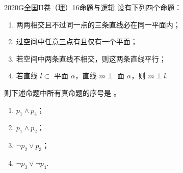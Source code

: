 
\begin{problem}{2020}{G}{全国II卷（理）}{16}{命题与逻辑}
设有下列四个命题：
\begin{enumerate}
\item[$ p_1 $:] 两两相交且不过同一点的三条直线必在同一平面内；
\item[$ p_2 $:] 过空间中任意三点有且仅有一个平面；
\item[$ p_3 $:] 若空间中两条直线不相交，则这两条直线平行；
\item[$ p_4 $:] 若直线 $ l \subset $ 平面 $ \alpha $，直线 $ m \perp $ 面 $ \alpha $，则 $ m \perp l $.
\end{enumerate}
则下述命题中所有真命题的序号是 \underline{\hspace{4em}}。

\begin{enumerate}
\item[$ \text{①} $] $ p_1 \land p_4 $；
\item[$ \text{②} $] $ p_1 \land p_2 $；
\item[$ \text{③} $] $ \lnot p_2 \lor p_3 $；
\item[$ \text{④} $] $ \lnot p_3 \lor \lnot p_4 $.
\end{enumerate}
\end{problem}

\begin{answer}

\end{answer}

\begin{solutions}

\end{solutions}